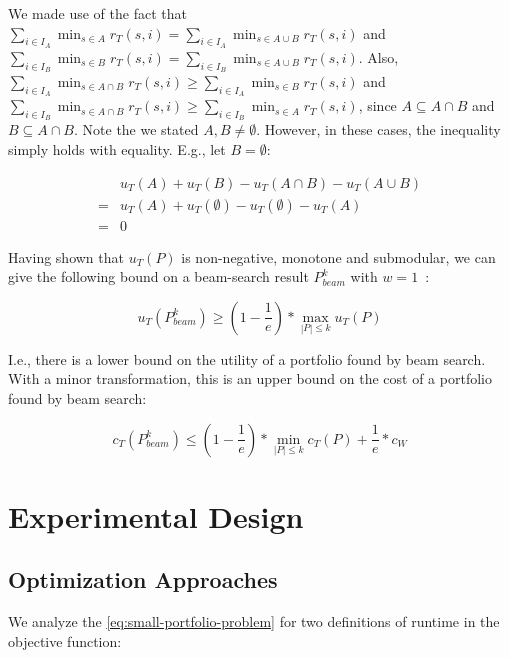 \documentclass[conference]{IEEEtran}
\begin{document}
We made use of the fact that $\sum_{i \in I_A}{\min_{s \in A}{r_T(s,i)}} = \sum_{i \in I_A}{\min_{s \in A \cup B}{r_T(s,i)}}$ and $\sum_{i \in I_B}{\min_{s \in B}{r_T(s,i)}} = \sum_{i \in I_B}{\min_{s \in A \cup B}{r_T(s,i)}}$.
Also, $\sum_{i \in I_A}{\min_{s \in A \cap B}{r_T(s,i)}} \geq \sum_{i \in I_A}{\min_{s \in B}{r_T(s,i)}}$ and $\sum_{i \in I_B}{\min_{s \in A \cap B}{r_T(s,i)}} \geq \sum_{i \in I_B}{\min_{s \in A}{r_T(s,i)}}$, since $A \subseteq A \cap B$ and $B \subseteq A \cap B$.
Note the we stated $A,B \neq \emptyset$.
However, in these cases, the inequality simply holds with equality.
E.g., let $B = \emptyset$:

\begin{align*}
	& u_{T}(A) + u_{T}(B) - u_{T}(A \cap B) - u_{T}(A \cup B)\\
	= & u_{T}(A) + u_{T}(\emptyset) - u_{T}(\emptyset) - u_{T}(A)\\
	= & 0
\end{align*}

Having shown that $u_{T}(P)$ is non-negative, monotone and submodular, we can give the following bound on a beam-search result $P_{beam}^k$ with $w=1$~\cite{nemhauser1978analysis, krause2014submodular}:

\begin{equation}
	u_{T}(P_{beam}^k) \geq (1 - \frac{1}{e}) * \max_{|P| \leq k}{u_{T}(P)}
\end{equation}

I.e., there is a lower bound on the utility of a portfolio found by beam search.
With a minor transformation, this is an upper bound on the cost of a portfolio found by beam search:

\begin{equation}
	c_{T}(P_{beam}^k) \leq (1 - \frac{1}{e}) * \min_{|P| \leq k}{c_{T}(P)} + \frac{1}{e} * c_W
	\label{eq:upper-bound}
\end{equation}

\section{Experimental Design}
\label{sec:experimental-design}

\subsection{Optimization Approaches}

We analyze the \ref{eq:small-portfolio-problem} for two definitions of runtime in the objective function:
\end{document}
